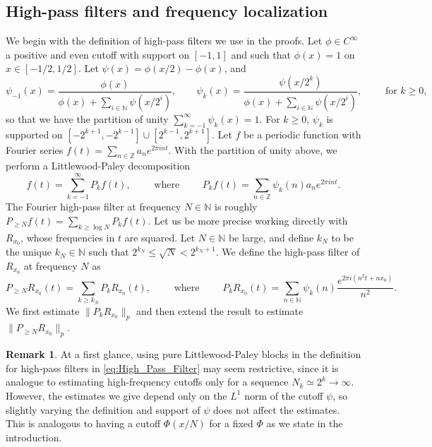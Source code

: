 \documentclass[11pt,reqno]{amsart}
\theoremstyle{definition}
\newtheorem{rem}[thm]{Remark}
\begin{document}
\subsection{High-pass filters and frequency localization}
\label{sec:High_Pass_Filter_And_Localized_Estimates}
We begin with the definition of high-pass filters we use in the proofs. 
Let $\phi \in C^\infty$ a positive and even cutoff with support on $[-1,1]$ and such that $\phi(x) = 1$ on $x\in [-1/2,1/2]$.  
Let $\psi(x) = \phi(x/2) - \phi(x)$, 
and 
 \begin{equation}\label{eq:Partition_Of_Unity}
\psi_{-1}(x) = \frac{\phi(x)}{\phi(x) + \sum_{i \in \mathbb N} \psi ( x/2^i )},
 \qquad 
\psi_k(x) = \frac{\psi ( x/2^k )}{\phi(x) + \sum_{i \in \mathbb N} \psi( x/2^i )}, 
\qquad \text{ for } k \geq 0, 
\end{equation}
so that we have the partition of unity $\sum_{k = -1}^\infty \psi_k(x) = 1$.
For $k \geq 0$, $\psi_k$ is supported on $[-2^{k+1},-2^{k-1}] \cup [2^{k-1},2^{k+1}]$. 
Let $f$ be a periodic function with Fourier series $f(t) = \sum_{ n \in \mathbb Z} a_n e^{2\pi i n t}$.
With the partition of unity above, we perform a Littlewood-Paley decomposition 
\begin{equation}
f(t) = \sum_{k = -1}^\infty P_kf(t), \qquad \text{ where } \qquad P_kf(t) = \sum_{n \in \mathbb Z} \psi_k(n) a_n e^{2\pi i n t}. 
\end{equation} 
The Fourier high-pass filter at frequency $N \in \mathbb N$
is roughly $P_{\geq N} f(t) = \sum_{k \geq \log N} P_kf(t)$. 
Let us be more precise working directly with $R_{x_0}$, 
whose frequencies in $t$ are squared.  
Let $N \in \mathbb N$ be large, 
and define $k_N$ to be the unique $k_N \in \mathbb N$ such that $2^{k_N} \leq \sqrt{N} < 2^{k_N+1}$. 
We define the high-pass filter of $R_{x_0}$ at frequency $N$ as 
\begin{equation}\label{eq:High_Pass_Filter}
P_{\geq N}  R_{x_0}(t) = \sum_{k \geq k_N} P_k R_{x_0}(t), 
\qquad \text{ where } \qquad P_kR_{x_0}(t) = \sum_{n \in \mathbb N } \psi_k(n) \frac{e^{2\pi i (n^2t + nx_0)}}{n^2}. 
\end{equation}
We first estimate $\lVert P_k R_{x_0} \rVert_p$
and  then extend the result to estimate $\lVert P_{\geq N} R_{x_0} \rVert_p$. 

\begin{rem}
At a first glance, using pure Littlewood-Paley blocks in the definition for high-pass filters in \eqref{eq:High_Pass_Filter} may seem restrictive, 
since it is analogue to estimating high-frequency cutoffs only for a sequence $N_k \simeq 2^k \to \infty$.  
However, the estimates we give depend only on the $L^1$ norm of the cutoff $\psi$, 
so slightly varying the definition and support of $\psi$ does not affect the estimates. 
This is analogous to having a cutoff $\Phi(x/N)$ for a fixed $\Phi$ as we state in the introduction.
\end{rem}
\end{document}
